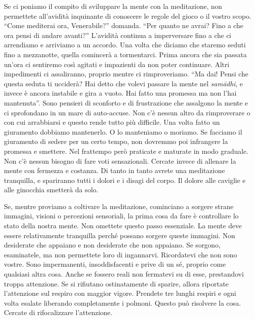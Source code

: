 Se ci poniamo il compito di sviluppare la mente con la meditazione, non
permettete all'avidità inquinante di conoscere le regole del gioco o il
vostro scopo. ``Come mediterai ora, Venerabile?'' domanda. ``Per quanto
ne avrai? Fino a che ora pensi di andare avanti?'' L'avidità continua a
imperversare fino a che ci arrendiamo e arriviamo a un accordo. Una
volta che diciamo che staremo seduti fino a mezzanotte, quella comincerà
a tormentarci. Prima ancora che sia passata un'ora ci sentiremo così
agitati e impazienti da non poter continuare. Altri impedimenti ci
assaliranno, proprio mentre ci rimproveriamo. ``Ma dai! Pensi che
questa seduta ti ucciderà? Hai detto che volevi passare la mente nel
\emph{samādhi}, e invece è ancora instabile e gira a vuoto. Hai fatto una
promessa ma non l'hai mantenuta''. Sono pensieri di sconforto e di
frustrazione che assalgono la mente e ci sprofondano in un mare di
auto-accuse. Non c'è nessun altro da rimproverare o con cui arrabbiarsi
e questo rende tutto più difficile. Una volta fatto un giuramento
dobbiamo mantenerlo. O lo manteniamo o moriamo. Se facciamo il
giuramento di sedere per un certo tempo, non dovremmo poi infrangere la
promessa e smettere. Nel frattempo però praticate e maturate in modo
graduale. Non c'è nessun bisogno di fare voti sensazionali. Cercate
invece di allenare la mente con fermezza e costanza. Di tanto in tanto
avrete una meditazione tranquilla, e spariranno tutti i dolori e i
disagi del corpo. Il dolore alle caviglie e alle ginocchia smetterà da
solo.

Se, mentre proviamo a coltivare la meditazione, cominciano a sorgere
strane immagini, visioni o percezioni sensoriali, la prima cosa da fare
è controllare lo stato della nostra mente. Non omettete questo passo
essenziale. La mente deve essere relativamente tranquilla perché possano
sorgere queste immagini. Non desiderate che appaiano e non desiderate
che non appaiano. Se sorgono, esaminatele, ma non permettete loro di
ingannarvi. Ricordatevi che non sono vostre. Sono impermanenti,
insoddisfacenti e prive di un sé, proprio come qualsiasi altra cosa.
Anche se fossero reali non fermatevi su di esse, prestandovi troppa
attenzione. Se si rifiutano ostinatamente di sparire, allora riportate
l'attenzione sul respiro con maggior vigore. Prendete tre lunghi respiri
e ogni volta esalate liberando completamente i polmoni. Questo può
risolvere la cosa. Cercate di rifocalizzare l'attenzione.

